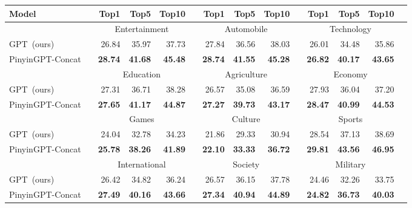 

\begin{table*}[!htp]\centering
\small
\begin{tabular}{lrrrrrrrrrrrrr}\toprule
Model & &Top1 &Top5 &Top10 & &Top1 &Top5 &Top10 & &Top1 &Top5 &Top10 \\\midrule
& &\multicolumn{3}{c}{Entertainment} & &\multicolumn{3}{c}{Automobile} & &\multicolumn{3}{c}{Technology} \\\cmidrule{3-5}\cmidrule{7-9}\cmidrule{11-13}
GPT~(ours) & &26.84 &35.97 &37.73 & &27.84 &36.56 &38.03 & &26.01 &34.48 &35.86 \\
PinyinGPT-Concat & &\textbf{28.74} &\textbf{41.68} &\textbf{45.48} &\textbf{} &\textbf{28.74} &\textbf{41.55} &\textbf{45.28} &\textbf{} &\textbf{26.82} &\textbf{40.17} &\textbf{43.65} \\
\midrule
& &\multicolumn{3}{c}{Education} & &\multicolumn{3}{c}{Agriculture} & &\multicolumn{3}{c}{Economy} \\\cmidrule{3-5}\cmidrule{7-9}\cmidrule{11-13}
GPT~(ours) & &27.31 &36.71 &38.28 & &26.57 &35.08 &36.59 & &27.93 &36.04 &37.20 \\
PinyinGPT-Concat & &\textbf{27.65} &\textbf{41.17} &\textbf{44.87} & &\textbf{27.27} &\textbf{39.73} &\textbf{43.17} &\textbf{} &\textbf{28.47} &\textbf{40.99} &\textbf{44.53} \\\midrule
& &\multicolumn{3}{c}{Games} & &\multicolumn{3}{c}{Culture} & &\multicolumn{3}{c}{Sports} \\\cmidrule{3-5}\cmidrule{7-9}\cmidrule{11-13}
GPT~(ours) & &24.04 &32.78 &34.23 & &21.86 &29.33 &30.94 & &28.54 &37.13 &38.69 \\
PinyinGPT-Concat & &\textbf{25.78} &\textbf{38.26} &\textbf{41.89} &\textbf{} &\textbf{22.10} &\textbf{33.33} &\textbf{36.72} & &\textbf{29.81} &\textbf{43.56} &\textbf{46.95} \\\midrule
& &\multicolumn{3}{c}{International} & &\multicolumn{3}{c}{Society} & &\multicolumn{3}{c}{Military} \\\cmidrule{3-5}\cmidrule{7-9}\cmidrule{11-13}
GPT~(ours) & &26.42 &34.82 &36.24 & &26.57 &36.15 &37.78 & &24.46 &32.26 &33.75 \\
PinyinGPT-Concat & &\textbf{27.49} &\textbf{40.16} &\textbf{43.66} &\textbf{} &\textbf{27.34} &\textbf{40.94} &\textbf{44.89} &\textbf{} &\textbf{24.82} &\textbf{36.73} &\textbf{40.03} \\\midrule

\end{tabular}
\end{table*}
